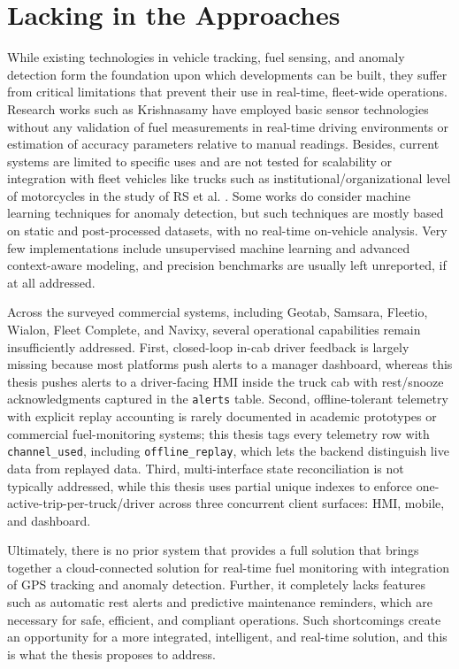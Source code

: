 \clearpage  %

\section{Lacking in the Approaches}

While existing technologies in vehicle tracking, fuel sensing, and anomaly detection form the foundation upon which developments can be built, they suffer from critical limitations that prevent their use in real-time, fleet-wide operations. Research works such as Krishnasamy \cite{krishnasamy2019} have employed basic sensor technologies without any validation of fuel measurements in real-time driving environments or estimation of accuracy parameters relative to manual readings. Besides, current systems are limited to specific uses and are not tested for scalability or integration with fleet vehicles like trucks such as institutional/organizational  level of motorcycles in the study of RS et al. \cite{rs2024fuel}. Some works do consider machine learning techniques for anomaly detection, but such techniques are mostly based on static and post-processed datasets, with no real-time on-vehicle analysis. Very few implementations include unsupervised machine learning and advanced context-aware modeling, and precision benchmarks are usually left unreported, if at all addressed.

Across the surveyed commercial systems, including Geotab, Samsara, Fleetio, Wialon, Fleet Complete, and Navixy, several operational capabilities remain insufficiently addressed. First, closed-loop in-cab driver feedback is largely missing because most platforms push alerts to a manager dashboard, whereas this thesis pushes alerts to a driver-facing HMI inside the truck cab with rest/snooze acknowledgments captured in the \texttt{alerts} table. Second, offline-tolerant telemetry with explicit replay accounting is rarely documented in academic prototypes or commercial fuel-monitoring systems; this thesis tags every telemetry row with \texttt{channel\_used}, including \texttt{offline\_replay}, which lets the backend distinguish live data from replayed data. Third, multi-interface state reconciliation is not typically addressed, while this thesis uses partial unique indexes to enforce one-active-trip-per-truck/driver across three concurrent client surfaces: HMI, mobile, and dashboard.

Ultimately, there is no prior system that provides a full solution that brings together a cloud-connected solution for real-time fuel monitoring with integration of GPS tracking and anomaly detection. Further, it completely lacks features such as automatic rest alerts and predictive maintenance reminders, which are necessary for safe, efficient, and compliant operations. Such shortcomings create an opportunity for a more integrated, intelligent, and real-time solution, and this is what the thesis proposes to address.

